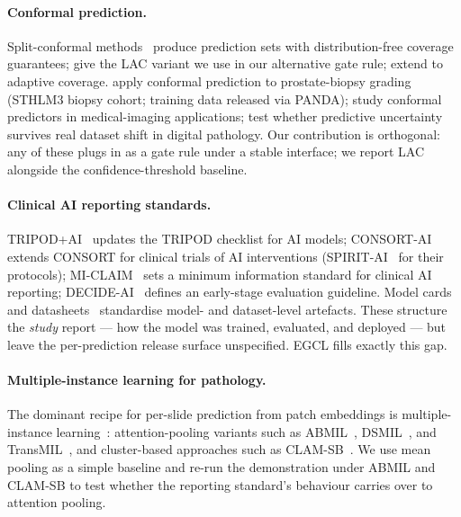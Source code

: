 \documentclass{article}
\begin{document}
\paragraph{Conformal prediction.} Split-conformal methods~\citep{vovk2005algorithmic,angelopoulos2021gentle} produce prediction sets with distribution-free coverage guarantees; \citet{sadinle2019least} give the LAC variant we use in our alternative gate rule; \citet{romano2020classification} extend to adaptive coverage. \citet{olsson2022estimating} apply conformal prediction to prostate-biopsy grading (STHLM3 biopsy cohort; training data released via PANDA); \citet{lu2021fairconformal} study conformal predictors in medical-imaging applications; \citet{thagaard2020trust} test whether predictive uncertainty survives real dataset shift in digital pathology. Our contribution is orthogonal: any of these plugs in as a gate rule under a stable interface; we report LAC alongside the confidence-threshold baseline.

\paragraph{Clinical AI reporting standards.} TRIPOD+AI~\citep{collins2024tripod} updates the TRIPOD checklist for AI models; CONSORT-AI~\citep{liu2020consort} extends CONSORT for clinical trials of AI interventions (SPIRIT-AI~\citep{cruzrivera2020spirit} for their protocols); MI-CLAIM~\citep{norgeot2020miclaim} sets a minimum information standard for clinical AI reporting; DECIDE-AI~\citep{vasey2022decide} defines an early-stage evaluation guideline. Model cards~\citep{mitchell2019modelcards} and datasheets~\citep{gebru2021datasheets} standardise model- and dataset-level artefacts. These structure the \emph{study} report --- how the model was trained, evaluated, and deployed --- but leave the per-prediction release surface unspecified. EGCL fills exactly this gap.

\paragraph{Multiple-instance learning for pathology.} The dominant recipe for per-slide prediction from patch embeddings is multiple-instance learning~\citep{campanella2019clinical}: attention-pooling variants such as ABMIL~\citep{ilse2018attention}, DSMIL~\citep{li2021dsmil}, and TransMIL~\citep{shao2021transmil}, and cluster-based approaches such as CLAM-SB~\citep{lu2021clam}. We use mean pooling as a simple baseline and re-run the demonstration under ABMIL and CLAM-SB to test whether the reporting standard's behaviour carries over to attention pooling.
\end{document}

